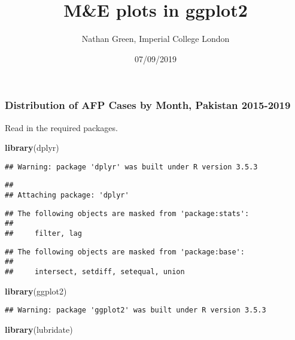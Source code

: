 \documentclass[]{article}
\title{M\&E plots in ggplot2}
\author{Nathan Green, Imperial College London}
\date{07/09/2019}
\newenvironment{Shaded}{\begin{snugshade}}{\end{snugshade}}
\newcommand{\KeywordTok}[1]{\textcolor[rgb]{0.13,0.29,0.53}{\textbf{#1}}}
\newcommand{\NormalTok}[1]{#1}
\begin{document}
\maketitle

\hypertarget{distribution-of-afp-cases-by-month-pakistan-2015-2019}{%
\subsubsection{Distribution of AFP Cases by Month, Pakistan
2015-2019}\label{distribution-of-afp-cases-by-month-pakistan-2015-2019}}

Read in the required packages.

\begin{Shaded}
\begin{Highlighting}[]
\KeywordTok{library}\NormalTok{(dplyr)}
\end{Highlighting}
\end{Shaded}

\begin{verbatim}
## Warning: package 'dplyr' was built under R version 3.5.3
\end{verbatim}

\begin{verbatim}
## 
## Attaching package: 'dplyr'
\end{verbatim}

\begin{verbatim}
## The following objects are masked from 'package:stats':
## 
##     filter, lag
\end{verbatim}

\begin{verbatim}
## The following objects are masked from 'package:base':
## 
##     intersect, setdiff, setequal, union
\end{verbatim}

\begin{Shaded}
\begin{Highlighting}[]
\KeywordTok{library}\NormalTok{(ggplot2)}
\end{Highlighting}
\end{Shaded}

\begin{verbatim}
## Warning: package 'ggplot2' was built under R version 3.5.3
\end{verbatim}

\begin{Shaded}
\begin{Highlighting}[]
\KeywordTok{library}\NormalTok{(lubridate)}
\end{Highlighting}
\end{Shaded}
\end{document}
